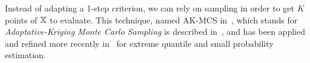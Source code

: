 \documentclass[../../Main_ManuscritThese.tex]{subfiles}
\begin{document}

Instead of adapting a 1-step criterion, we can rely on sampling in order
to get $K$ points of $\mathbb{X}$ to evaluate.  This technique, named
AK-MCS in~\cite{echard_ak-mcs_2011}, which stands for
\emph{Adaptative-Kriging Monte Carlo Sampling} is described
in~\cite{dubourg_reliability-based_2011}, and has been applied and
refined more recently
in~\cite{schobi_rare_2017,razaaly_quantile-based_2020,razaaly_rare_2019}
for extreme quantile and small probability estimation.
\end{document}
